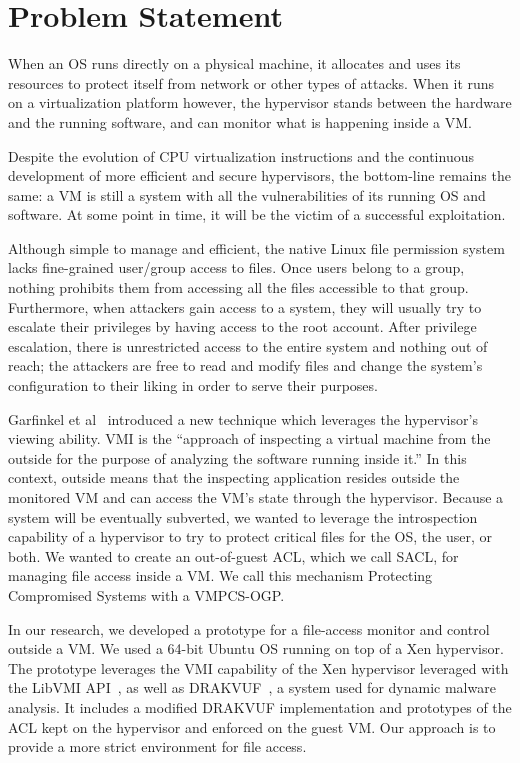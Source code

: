 \section{Problem Statement}\label{sec:problem} 
When an \ac{OS} runs directly on a physical machine, it allocates and uses its resources to protect itself from network or other types of attacks. When it runs on a virtualization platform however, the hypervisor stands between the hardware and the running software, and can monitor what is happening inside a \ac{VM}. 

\par Despite the evolution of \ac{CPU} virtualization instructions and the continuous development of more efficient and secure hypervisors, the bottom-line remains the same: a \ac{VM} is still a system with all the vulnerabilities of its running \ac{OS} and software. At some point in time, it will be the victim of a successful exploitation. 

\par Although simple to manage and efficient, the native Linux file permission system lacks fine-grained user/group access to files. Once users belong to a group, nothing prohibits them from accessing all the files accessible to that group. Furthermore, when attackers gain access to a system, they will usually try to escalate their privileges by having access to the root account. After privilege escalation, there is unrestricted access to the entire system and nothing out of reach; the attackers are free to read and modify files and change the system's configuration to their liking in order to serve their purposes.

\par Garfinkel et al~\cite{garfinkel2003virtual} introduced a new technique which leverages the hypervisor's viewing ability. \ac{VMI} is the “approach of inspecting a virtual machine from the outside for the purpose of analyzing the software running inside it.” In this context, outside means that the inspecting application resides outside the monitored \ac{VM} and can access the \ac{VM}'s state through the hypervisor. Because a system will be eventually subverted, we wanted to leverage the introspection capability of a hypervisor to try to protect critical files for the OS, the user, or both. We wanted to create an out-of-guest \ac{ACL}, which we call \ac{SACL}, for managing file access inside a VM. We call this mechanism Protecting Compromised Systems with a \ac{VMPCS-OGP}.

\par In our research, we developed a prototype for a file-access monitor and control outside a \ac{VM}. We used a 64-bit Ubuntu OS running on top of a Xen hypervisor. The prototype leverages the \ac{VMI} capability of the Xen hypervisor leveraged with the LibVMI \ac{API}~\cite{payne2011libvmi}, as well as DRAKVUF~\cite{lengyel2014drakvuf}, a system used for dynamic malware analysis. It includes a modified DRAKVUF implementation and prototypes of the \ac{ACL} kept on the hypervisor and enforced on the guest \ac{VM}. Our approach is to provide a more strict environment for file access.

